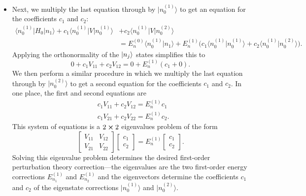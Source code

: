 \documentclass[11pt, a4paper]{article}
\newcommand{\bket}[1]{\big | {#1} \big \rangle }
\newcommand{\bbraket}[2]{\big \langle {#1} \big | {#2} \big \rangle}  %
\newcommand{\bmel}[3]{\big \langle {#1} \big | {#2} \big | {#3} \big \rangle}  %
\begin{document}
\begin{itemize}
    \item Next, we multiply the last equation through by $ \bket{n_{0}^{(1)}} $ to get an equation for the coefficients $ c_{1} $ and $ c_{2} $:
    \begin{align*}
        \bmel{n_{0}^{(1)}}{H_{0}}{n_{1}} + c_{1}\bmel{n_{0}^{(1)}}{V}{n_{0}^{(1)}} &+ c_{2}\bmel{n_{0}^{(1)}}{V}{n_{0}^{(2)}} \\
        & = E_{n}^{(0)} \bbraket{n_{0}^{(1)}}{n_{1}} + E_{n}^{(1)}\big( c_{1}\bbraket{n_{0}^{(1)}}{n_{0}^{(1)}} + c_{2} \bbraket{n_{0}^{(1)}}{n_{0}^{(2)}} \big).
    \end{align*}
    Applying the orthonormality of the $ \ket{n_{j}} $ states simplifies this to
    \begin{equation*}
        0 + c_{1}V_{11} + c_{2}V_{12} = 0 + E_{n}^{(1)}(c_{1} + 0).
    \end{equation*}
    We then perform a similar procedure in which we multiply the last equation through by $ \bket{n_{0}^{(2)}} $ to get a second equation for the coefficients $ c_{1} $ and $ c_{2} $. In one place, the first and second equations are
    \begin{align*}
        & c_{1}V_{11} + c_{2}V_{12} = E_{n}^{(1)} c_{1}\\
        & c_{1}V_{21} + c_{2}V_{22} = E_{n}^{(1)} c_{2}.
    \end{align*}
    This system of equations is a $ 2 \cross 2 $ eigenvalues problem of the form
    \begin{equation*}
        \begin{bmatrix}
            V_{11} & V_{12}\\
            V_{21} & V_{22}
        \end{bmatrix}
        \begin{bmatrix}
            c_{1}\\
            c_{2}
        \end{bmatrix}
        = E_{n}^{(1)}
        \begin{bmatrix}
            c_{1}\\
            c_{2}
        \end{bmatrix}.
    \end{equation*}
    Solving this eigenvalue problem determines the desired first-order perturbation theory correction---the eigenvalues are the two first-order energy corrections $ E_{n_{1}}^{(1)} $ and $ E_{n_{2}}^{(1)} $ and the eigenvectors determine the coefficients $ c_{1} $ and $ c_{2} $ of the eigenstate corrections $ \bket{n_{0}^{(1)}} $ and $ \bket{n_{0}^{(2)}} $. 
\end{itemize}
\end{document}
